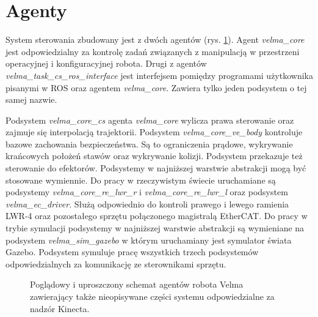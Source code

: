 	\section{Agenty}
	System sterowania \cite{bib:velma2} zbudowany jest z dwóch agentów (rys. \ref{fig:agent}). Agent \textit{velma\_core} jest odpowiedzialny za kontrolę zadań związanych z manipulacją w przestrzeni operacyjnej i konfiguracyjnej robota. Drugi z agentów \textit{velma\_task\_cs\_ros\_interface} jest interfejsem pomiędzy programami użytkownika pisanymi w ROS oraz agentem \textit{velma\_core}. Zawiera tylko jeden podsystem o tej samej nazwie.

	Podsystem \textit{velma\_core\_cs} agenta \textit{velma\_core} wylicza prawa sterowanie oraz zajmuje się interpolacją trajektorii. Podsystem \textit{velma\_core\_ve\_body} kontroluje bazowe zachowania bezpieczeństwa. Są to ograniczenia prądowe, wykrywanie krańcowych położeń stawów oraz wykrywanie kolizji. Podsystem przekazuje też sterowanie do efektorów. Podsystemy w najniższej warstwie abstrakcji mogą być stosowane wymiennie. Do pracy w rzeczywistym świecie uruchamiane są podsystemy \textit{velma\_core\_re\_lwr\_r} i \textit{velma\_core\_re\_lwr\_l} oraz podsystem \textit{velma\_ec\_driver}. Służą odpowiednio do kontroli prawego i lewego ramienia LWR-4 oraz pozostałego sprzętu połączonego magistralą EtherCAT. Do pracy w trybie symulacji podsystemy w najniższej warstwie abstrakcji są wymieniane na podsystem \textit{velma\_sim\_gazebo} w którym uruchamiany jest symulator świata Gazebo. Podsystem symuluje pracę wszystkich trzech podsystemów odpowiedzialnych za komunikację ze sterownikami sprzętu. 
	
		\begin{figure}
		\centering
		\hfill
		
		\caption{Poglądowy i uproszczony schemat agentów robota Velma zawierający także nieopisywane części systemu odpowiedzialne za nadzór Kinecta\cite{bib:velma2}.}
		\label{fig:agent}
		
	\end{figure}


